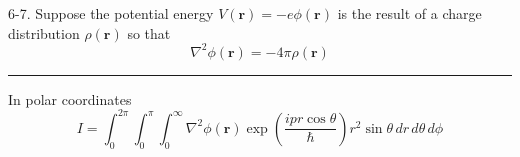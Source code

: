 \documentclass[12pt]{article}
\begin{document}
6-7.
Suppose the potential energy $V(\mathbf r)=-e\phi(\mathbf r)$
is the result of a charge distribution $\rho(\mathbf r)$ so that
\begin{equation*}
\nabla^2\phi(\mathbf r)=-4\pi\rho(\mathbf r)
\tag{6.48}
\end{equation*}

\bigskip
\hrule

\bigskip
In polar coordinates
\begin{equation*}
I=\int_0^{2\pi}\int_0^\pi\int_0^\infty
\nabla^2\phi(\mathbf r)
\exp\left(\frac{ipr\cos\theta}{\hbar}\right)
r^2\sin\theta\,dr\,d\theta\,d\phi
\end{equation*}

\end{document}

